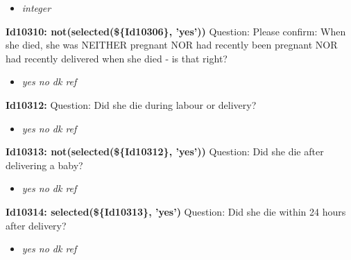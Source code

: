 \documentclass{article}%
\begin{document}
%
\begin{itemize}%
\item%
\textit{integer\newline%
}%
\end{itemize}%
\textbf{Id10310: not(selected(\$\{Id10306\}, 'yes'))\newline%
}%
Question: Please confirm: When she died, she was NEITHER pregnant NOR had recently been pregnant NOR had recently delivered when she died {-} is that right?\newline%
%
\begin{itemize}%
\item%
\textit{yes\newline%
 no\newline%
 dk\newline%
 ref\newline%
}%
\end{itemize}%
\textbf{Id10312: \newline%
}%
Question: Did she die during labour or delivery?\newline%
%
\begin{itemize}%
\item%
\textit{yes\newline%
 no\newline%
 dk\newline%
 ref\newline%
}%
\end{itemize}%
\textbf{Id10313: not(selected(\$\{Id10312\}, 'yes'))\newline%
}%
Question: Did she die after delivering a baby?\newline%
%
\begin{itemize}%
\item%
\textit{yes\newline%
 no\newline%
 dk\newline%
 ref\newline%
}%
\end{itemize}%
\textbf{Id10314: selected(\$\{Id10313\}, 'yes')\newline%
}%
Question: Did she die within 24 hours after delivery?\newline%
%
\begin{itemize}%
\item%
\textit{yes\newline%
 no\newline%
 dk\newline%
 ref\newline%
}%
\end{itemize}%
\end{document}
